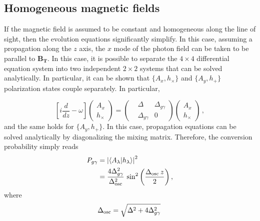 \documentclass[twocolumn,superscriptaddress,floatfix,preprintnumbers, nofootinbib,hyperref]{revtex4-2}
\begin{document}
\subsection{Homogeneous magnetic fields}
\label{subsec:HomogeneousField}
If the magnetic field is assumed to be constant and homogeneous along the line of sight, then the evolution equations significantly simplify. In this case, assuming a propagation along the $z$ axis, the $x$ mode of the photon field can be taken to be parallel to $\mathbf{B_T}$. In this case, it is possible to separate the $4\times4$ differential equation system into two independent $2\times2$ systems that can be solved analytically. In particular, it can be shown that $\{A_{x},h_{\times}\}$ and $\{A_{y},h_{+}\}$ polarization states couple separately. In particular, 

\begin{equation}
    \left[i\frac{d}{dz} -\omega\right]\begin{pmatrix}
                                            A_{x}\\
                                            h_{\times}
                                        \end{pmatrix}
            =\begin{pmatrix}
            &\Delta   & \Delta_{g\gamma}\\   
            &\Delta_{g\gamma}                      & 0\,
        \end{pmatrix}   \begin{pmatrix}
                            A_{x}\\
                             h_{\times}
                            \end{pmatrix}  \,,
    \label{Eq:EOMhom}
\end{equation}
and the same holds for $\{A_{y},h_{+}\}$. In this case, propagation equations can be solved analytically by diagonalizing the mixing matrix.
Therefore, the conversion probability simply reads~\cite{Raffelt:1987im}
\begin{equation}
    \begin{split}
        P_{g\gamma}&=\left|\langle A_\lambda|h_\lambda\rangle \right|^2\\
        &=\frac{4\Delta_{g\gamma}^2}{\Delta_{\rm osc}^2}\,\sin^2{\left(\frac{\Delta_{\rm osc}\,z}{2}\right)}\,,
    \end{split}
\label{Eq:ProbConstB}
\end{equation}
where 
\begin{equation}
    \Delta_{\rm osc} =\sqrt{\Delta^2+4\Delta_{g\gamma}^2}\,
\end{equation}
\end{document}
